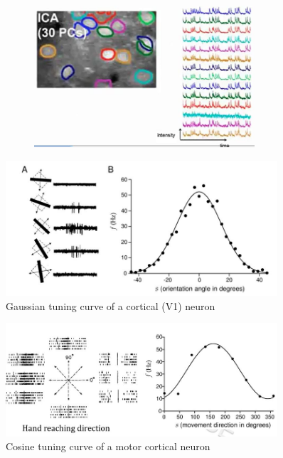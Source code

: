 \documentclass[]{article}
\begin{document}
\begin{figure}[H]
\begin{subfigure}[b]{0.3\textwidth}
	\end{subfigure}
	\begin{subfigure}[b]{\textwidth}
	\caption{}\label{fig:rb6}
	\includegraphics[width=0.9\textwidth]{calcium-imaging}
\end{subfigure}
\end{figure}


\begin{figure}[H]
	\begin{center}
		\caption{Gaussian tuning curve of a cortical (V1) neuron}
		\includegraphics[width=0.9\textwidth]{tuning-curves}
	\end{center}
\end{figure}

\begin{figure}[H]
	\begin{center}
		\caption{Cosine tuning curve of a motor cortical neuron}
		\includegraphics[width=0.9\textwidth]{tuning-curves1}
	\end{center}
\end{figure}
\end{document}
